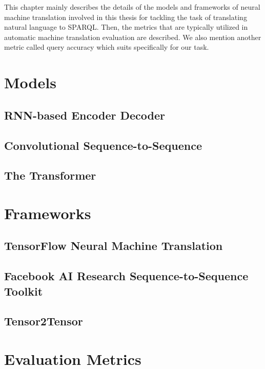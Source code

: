
This chapter mainly describes the details of the models and frameworks of neural machine translation involved in this thesis for tackling the task of translating natural language to SPARQL. Then, the metrics that are typically utilized in automatic machine translation evaluation are described. We also mention another metric called query accuracy which suits specifically for our task.

\section{Models}

\subsection{RNN-based Encoder Decoder}

\subsection{Convolutional Sequence-to-Sequence}

\subsection{The Transformer}






\section{Frameworks}

\subsection{TensorFlow Neural Machine Translation}

\subsection{Facebook AI Research Sequence-to-Sequence Toolkit}

\subsection{Tensor2Tensor}







\section{Evaluation Metrics}

